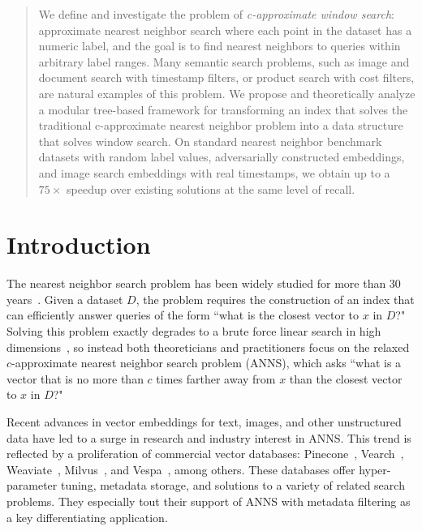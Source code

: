 \documentclass{article}
\theoremstyle{plain}
\theoremstyle{definition}
\theoremstyle{remark}
\newcommand{\laxman}[1]{{\color{teal}{\bf Laxman:} #1}}
\begin{document}
\begin{abstract}
We define and investigate the problem of \textit{c-approximate window search}: approximate nearest neighbor search where each point in the dataset has a numeric label, and the goal is to find nearest neighbors to queries within arbitrary label ranges. 
Many semantic search problems, such as image and document search with timestamp filters, or product search with cost filters, are natural examples of this problem. 
We propose and theoretically analyze a modular tree-based framework for transforming an index that solves the traditional c-approximate nearest neighbor problem into a data structure that solves window search. 
On standard nearest neighbor benchmark datasets with random label values, adversarially constructed embeddings, and image search embeddings with real timestamps, we obtain up to a $75\times$ speedup over existing solutions at the same level of recall.
\end{abstract}


\section{Introduction}
The nearest neighbor search problem has been widely studied for more than 30 years~\cite{arya1993approximate}. Given a dataset $D$, the problem requires the construction of an index that can efficiently answer queries of the form ``what is the closest vector to $x$ in $D$?" Solving this problem exactly degrades to a brute force linear search  in high dimensions~\cite{rubinstein2018hardness}, so instead both theoreticians and practitioners focus on the relaxed $c$-approximate nearest neighbor search problem (ANNS), which asks ``what is a vector that is no more than $c$ times farther away from $x$ than the closest vector to $x$ in $D$?"

Recent advances in vector embeddings for text, images, and other unstructured data have led to a  surge in research and industry interest in ANNS. 
This trend is reflected by a proliferation of commercial vector databases: Pinecone~\cite{pinecone2024overview}, Vearch~\cite{vearch2022search}, Weaviate~\cite{weaviate2022filters}, Milvus~\cite{milvus2022hybridsearch}, and Vespa~\cite{vespa2022semistructured}, among others. 
These databases offer hyper-parameter tuning, metadata storage, and solutions to a variety of related search problems. They especially tout their support of ANNS with metadata filtering as a key differentiating application. 
\end{document}
